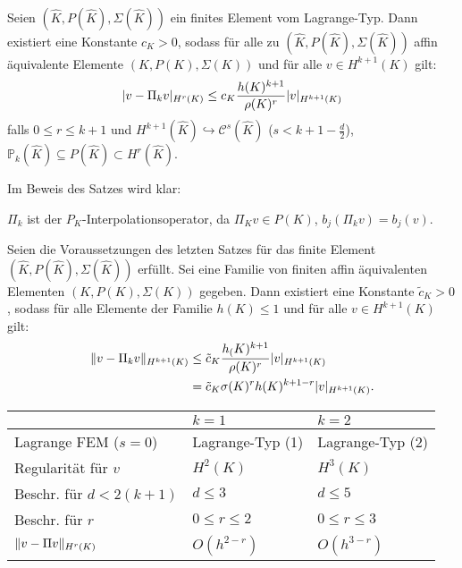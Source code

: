 \documentclass{cheat-sheet}
\newcommand{\Cont}{\mathcal{C}} %
\begin{document}
\begin{satz} \mbox{} \\
  Seien $(\hat{K}, P(\hat{K}), \Sigma(\hat{K}))$ ein finites Element vom Lagrange-Typ.
  Dann existiert eine Konstante $c_K > 0$, sodass für alle zu $(\hat{K}, P(\hat{K}), \Sigma (\hat{K}))$ affin äquivalente Elemente $(K, P(K), \Sigma(K))$ und für alle $v \in H^{k+1}(K)$ gilt:
  \[
    \lvert v - \Pi_k v\rvert_{H^r(K)} \leq c_K \frac{h(K)^{k+1}}{\rho(K)^r} \lvert v\rvert_{H^{k+1}(K)}
  \]
  falls $0 \leq r \leq k+1$ und $H^{k+1}(\hat{K}) \hookrightarrow \Cont^s(\hat{K})$ ($s < k+1-\tfrac{d}{2}$), $\mathbb{P}_k(\hat{K}) \subseteq P(\hat{K}) \subset H^r(\hat{K})$.
\end{satz}

Im Beweis des Satzes wird klar:

$\Pi_k$ ist der $P_K$-Interpolationsoperator, da $\Pi_K v \in P(K)$, $b_j (\Pi_k v) = b_j(v)$.

\begin{kor}
  Seien die Voraussetzungen des letzten Satzes für das finite Element $(\hat{K}, P(\hat{K}), \Sigma(\hat{K}))$ erfüllt.
  Sei eine Familie von finiten affin äquivalenten Elementen $(K, P(K), \Sigma(K))$ gegeben.
  Dann existiert eine Konstante $\tilde{c}_K > 0$, sodass für alle Elemente der Familie $h(K) \leq 1$ und für alle $v \in H^{k+1}(K)$ gilt:
  \begin{align*}
    \lVert v - \Pi_k v\rVert_{H^{k+1}(K)} & \leq \tilde{c}_K \frac{h_(K)^{k+1}}{\rho(K)^r} \lvert v\rvert_{H^{k+1}(K)} \\
    & = \tilde{c}_K \sigma(K)^r h(K)^{k+1-r} \lvert v\rvert_{H^{k+1}(K)}.
  \end{align*}
\end{kor}

\begin{bsp}
  \begin{tabular}{l l l}
    & $k=1$ & $k=2$ \\ \hline
    Lagrange FEM ($s = 0$) & Lagrange-Typ (1) & Lagrange-Typ (2) \\
    Regularität für $v$ & $H^2(K)$ & $H^3(K)$ \\
    Beschr. für $d < 2 (k+1)$ & $d \leq 3$ & $d \leq 5$ \\
    Beschr. für $r$ & $0 \leq r \leq 2$ & $0 \leq r \leq 3$ \\
    $\lVert v - \Pi v\rVert_{H^r(K)}$ & $O(h^{2-r})$ & $O(h^{3-r})$
  \end{tabular}
\end{bsp}
\end{document}

